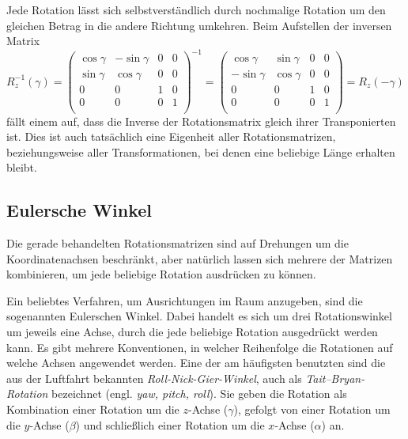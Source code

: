 Jede Rotation lässt sich selbstverständlich durch nochmalige Rotation um den gleichen Betrag in die andere Richtung umkehren. Beim Aufstellen der inversen Matrix
\begin{equation}
 R_z^{-1}{(\gamma)}
 = 
 \begin{pmatrix}
  \cos \gamma & -\sin \gamma & 0 & 0 \\
  \sin \gamma &  \cos \gamma & 0 & 0 \\
  0 & 0 & 1 & 0 \\
  0 & 0 & 0 & 1 \\
 \end{pmatrix}^{-1}
 = 
 \begin{pmatrix}
   \cos \gamma & \sin \gamma & 0 & 0 \\
  -\sin \gamma & \cos \gamma & 0 & 0 \\
  0 & 0 & 1 & 0 \\
  0 & 0 & 0 & 1 \\
 \end{pmatrix}
 = R_z{(-\gamma)}
\end{equation}
fällt einem auf, dass die Inverse der Rotationsmatrix gleich ihrer Transponierten ist. Dies ist auch tatsächlich eine Eigenheit aller Rotationsmatrizen, beziehungsweise aller Transformationen, bei denen eine beliebige Länge erhalten bleibt.

\subsection{Eulersche Winkel}
Die gerade behandelten Rotationsmatrizen sind auf Drehungen um die Koordinatenachsen beschränkt, aber natürlich lassen sich mehrere der Matrizen kombinieren, um jede beliebige Rotation ausdrücken zu können.

Ein beliebtes Verfahren, um Ausrichtungen im Raum anzugeben, sind die sogenannten Eulerschen Winkel. Dabei handelt es sich um drei Rotationswinkel um jeweils eine Achse, durch die jede beliebige Rotation ausgedrückt werden kann. Es gibt mehrere Konventionen, in welcher Reihenfolge die Rotationen auf welche Achsen angewendet werden. Eine der am häufigsten benutzten sind die aus der Luftfahrt bekannten \emph{Roll-Nick-Gier-Winkel}, auch als \emph{Tait–Bryan-Rotation} bezeichnet (engl. \emph{yaw, pitch, roll}). Sie geben die Rotation als Kombination einer Rotation um die $z$-Achse ($\gamma$), gefolgt von einer Rotation um die $y$-Achse ($\beta$) und schließlich einer Rotation um die $x$-Achse ($\alpha$) an.

